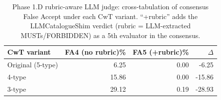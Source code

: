 \begin{table}[htbp]
\centering\small
\caption{Phase 1.D rubric-aware LLM judge: cross-tabulation of consensus False Accept under each CwT variant. ``+rubric'' adds the LLMCatalogueShim verdict (rubric = LLM-extracted MUSTs/FORBIDDEN) as a 5th evaluator in the consensus.}
\label{tab:phase1d_rubric_aware}
\begin{tabular}{lrrr}
\toprule
CwT variant & FA4 (no rubric)\% & FA5 (+rubric)\% & $\Delta$ \\
\midrule
  Original (5-type) & 6.25 & 0.00 & -6.25 \\
  4-type & 15.86 & 0.00 & -15.86 \\
  3-type & 29.12 & 0.19 & -28.93 \\
\bottomrule
\end{tabular}
\end{table}
